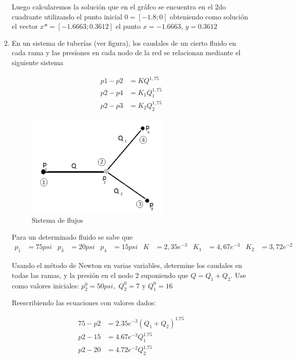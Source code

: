 \documentclass{udpreport}
\begin{document}
\begin{enumerate}
        Luego calcularemos la solución que en el gráfco se encuentra en el 2do cuadrante utilizando el punto inicial $0=[-1.8;0]$
        obteniendo como solución el vector $x*=[-1.6663;0.3612]$ el punto  $x=-1.6663$, $y=0.3612$

    
        \newpage
        
        \item En un sistema de tuberías (ver figura), los caudales de un cierto fluido en cada rama y las presiones en cada nodo de la red se relacionan mediante el siguiente sistema
        
        \begin{align*} 
            p1 - p2 &= KQ^{1,75} \\ 
            p2 - p4 &= K_1 Q_1^{1,75}\\
            p2 - p3 &= K_2 Q_2^{1,75}
        \end{align*}
        
    \begin{figure}[H]
    \centering
    \includegraphics[width=7cm]{imagenEjec}
    \caption{Sistema de flujos}
    \end{figure}        
    
    Para un determinado fluido se sabe que
    \begin{align*}
    p_1&=75psi & p_3&=20psi &  p_4&=15psi & K&=2,35e^{-3} & K_1&=4,67e^{-3} & K_2&=3,72e^{-2}
    \end{align*}
    
    Usando el método de Newton en varias variables, determine los caudales en todas las ramas, y la presión en el nodo 2 suponiendo que $Q = Q_1 + Q_2 $. Use como valores iniciales: $ p_2^0= 50 psi,$  $Q_2^0=7$ y  $Q_1^0=16$
    
    
    Reescribiendo las ecuaciones con valores dados:
    
    \begin{align*} 
        75 - p2 &=  2.35e^{-3}(Q_1+Q_2)^{1.75} \\ 
        p2 - 15 &= 4.67e^{-3}Q_1^{1.75} \\
        p2 - 20 &= 4.72e^{-2}Q_2^{1.75}
    \end{align*}
    

\end{enumerate}
\end{document}
